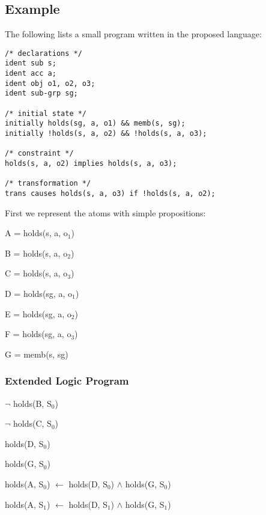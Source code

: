 \documentclass[a4paper]{article}
\begin{document}
    \subsection{Example}

      The following lists a small program written in the proposed language:

      \begin{verbatim}
/* declarations */
ident sub s;
ident acc a;
ident obj o1, o2, o3;
ident sub-grp sg;

/* initial state */
initially holds(sg, a, o1) && memb(s, sg);
initially !holds(s, a, o2) && !holds(s, a, o3);

/* constraint */
holds(s, a, o2) implies holds(s, a, o3);

/* transformation */
trans causes holds(s, a, o3) if !holds(s, a, o2);
      \end{verbatim}

      First we represent the atoms with simple propositions:

      \begin{list}{}{}
        \item A = holds(s, a, o$_{1}$)
        \item B = holds(s, a, o$_{2}$)
        \item C = holds(s, a, o$_{3}$)
        \item D = holds(sg, a, o$_{1}$)
        \item E = holds(sg, a, o$_{2}$)
        \item F = holds(sg, a, o$_{3}$)
        \item G = memb(s, sg)
      \end{list}

      \subsubsection{Extended Logic Program}

        \begin{list}{}{Initial State}
          \item $\lnot$ holds(B, S$_{0}$)
          \item $\lnot$ holds(C, S$_{0}$)
          \item holds(D, S$_{0}$)
          \item holds(G, S$_{0}$)
        \end{list}

        \begin{list}{}{Inheritance Rules}
          \item 
            holds(A, S$_{0}$) $\leftarrow$ holds(D, S$_{0}$) $\land$ 
            holds(G, S$_{0}$)
          \item
            holds(A, S$_{1}$) $\leftarrow$ holds(D, S$_{1}$) $\land$ 
            holds(G, S$_{1}$)
        \end{list}
\end{document}
